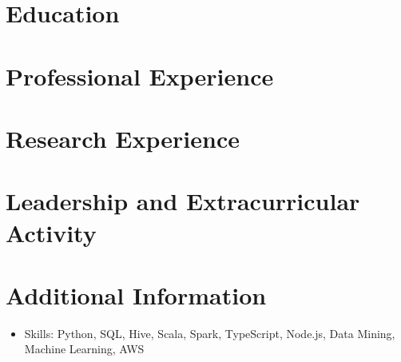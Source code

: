 \documentclass{resumeEN}
\begin{document}
\section{Education}

\pennmaster
\thuundergrad
\umnexchange

\section{Professional Experience}

\amazon
\msra
\bytedance
\continental
\summitview

\section{Research Experience}

\ryanresearch
\umnresearch
\fifaresearch

\section{Leadership and Extracurricular Activity}

\eydatascience
\cnkibibtex
\cydp
\tkd
\semtech

\section{Additional Information}

\vspace{0.618ex}
\begin{itemize}
\item Skills: Python, SQL, Hive, Scala, Spark, TypeScript, Node.js, Data Mining, Machine Learning, AWS
\end{itemize}
\end{document}
